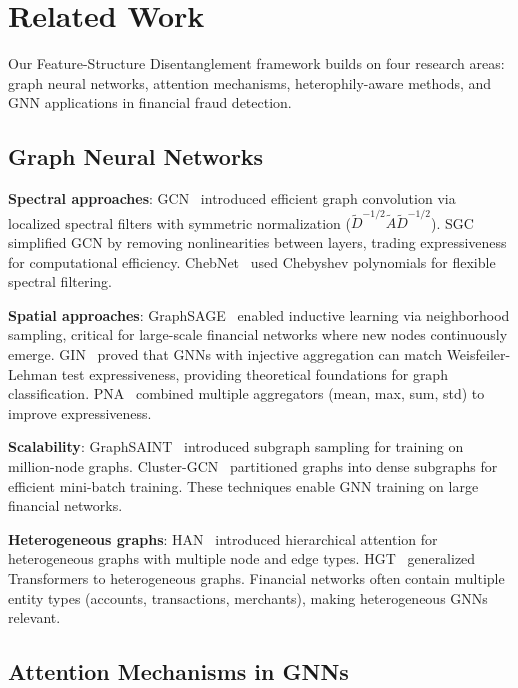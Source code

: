 \section{Related Work}
\label{sec:related}

Our Feature-Structure Disentanglement framework builds on four research areas: graph neural networks, attention mechanisms, heterophily-aware methods, and GNN applications in financial fraud detection.

\subsection{Graph Neural Networks}

\textbf{Spectral approaches}: GCN~\cite{kipf2017gcn} introduced efficient graph convolution via localized spectral filters with symmetric normalization ($\tilde{D}^{-1/2}\tilde{A}\tilde{D}^{-1/2}$). SGC~\cite{wu2019sgc} simplified GCN by removing nonlinearities between layers, trading expressiveness for computational efficiency. ChebNet~\cite{defferrard2016chebnet} used Chebyshev polynomials for flexible spectral filtering.

\textbf{Spatial approaches}: GraphSAGE~\cite{hamilton2017graphsage} enabled inductive learning via neighborhood sampling, critical for large-scale financial networks where new nodes continuously emerge. GIN~\cite{xu2019gin} proved that GNNs with injective aggregation can match Weisfeiler-Lehman test expressiveness, providing theoretical foundations for graph classification. PNA~\cite{corso2020pna} combined multiple aggregators (mean, max, sum, std) to improve expressiveness.

\textbf{Scalability}: GraphSAINT~\cite{zeng2020graphsaint} introduced subgraph sampling for training on million-node graphs. Cluster-GCN~\cite{chiang2019clustergcn} partitioned graphs into dense subgraphs for efficient mini-batch training. These techniques enable GNN training on large financial networks.

\textbf{Heterogeneous graphs}: HAN~\cite{wang2019han} introduced hierarchical attention for heterogeneous graphs with multiple node and edge types. HGT~\cite{hu2020hgt} generalized Transformers to heterogeneous graphs. Financial networks often contain multiple entity types (accounts, transactions, merchants), making heterogeneous GNNs relevant.

\subsection{Attention Mechanisms in GNNs}

